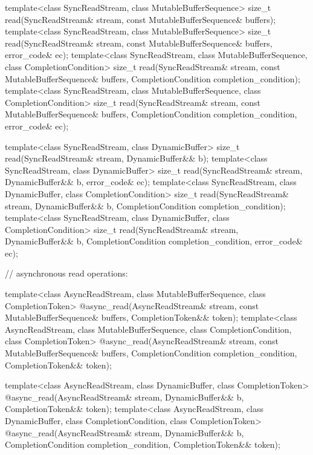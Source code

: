\begin{codeblock}
{{{{  template<class SyncReadStream, class MutableBufferSequence>
    size_t read(SyncReadStream& stream,
                const MutableBufferSequence& buffers);
  template<class SyncReadStream, class MutableBufferSequence>
    size_t read(SyncReadStream& stream,
                const MutableBufferSequence& buffers, error_code& ec);
  template<class SyncReadStream, class MutableBufferSequence,
    class CompletionCondition>
      size_t read(SyncReadStream& stream,
                  const MutableBufferSequence& buffers,
                  CompletionCondition completion_condition);
  template<class SyncReadStream, class MutableBufferSequence,
    class CompletionCondition>
      size_t read(SyncReadStream& stream,
                  const MutableBufferSequence& buffers,
                  CompletionCondition completion_condition,
                  error_code& ec);

  template<class SyncReadStream, class DynamicBuffer>
    size_t read(SyncReadStream& stream, DynamicBuffer&& b);
  template<class SyncReadStream, class DynamicBuffer>
    size_t read(SyncReadStream& stream, DynamicBuffer&& b, error_code& ec);
  template<class SyncReadStream, class DynamicBuffer, class CompletionCondition>
    size_t read(SyncReadStream& stream, DynamicBuffer&& b,
                CompletionCondition completion_condition);
  template<class SyncReadStream, class DynamicBuffer, class CompletionCondition>
    size_t read(SyncReadStream& stream, DynamicBuffer&& b,
                CompletionCondition completion_condition, error_code& ec);

  // asynchronous read operations:

  template<class AsyncReadStream, class MutableBufferSequence,
    class CompletionToken>
      @\DEDUCED@ async_read(AsyncReadStream& stream,
                         const MutableBufferSequence& buffers,
                         CompletionToken&& token);
  template<class AsyncReadStream, class MutableBufferSequence,
    class CompletionCondition, class CompletionToken>
      @\DEDUCED@ async_read(AsyncReadStream& stream,
                         const MutableBufferSequence& buffers,
                         CompletionCondition completion_condition,
                         CompletionToken&& token);

  template<class AsyncReadStream, class DynamicBuffer, class CompletionToken>
    @\DEDUCED@ async_read(AsyncReadStream& stream,
                       DynamicBuffer&& b, CompletionToken&& token);
  template<class AsyncReadStream, class DynamicBuffer,
    class CompletionCondition, class CompletionToken>
      @\DEDUCED@ async_read(AsyncReadStream& stream,
                         DynamicBuffer&& b,
                         CompletionCondition completion_condition,
                         CompletionToken&& token);

}}}}
\end{codeblock}
